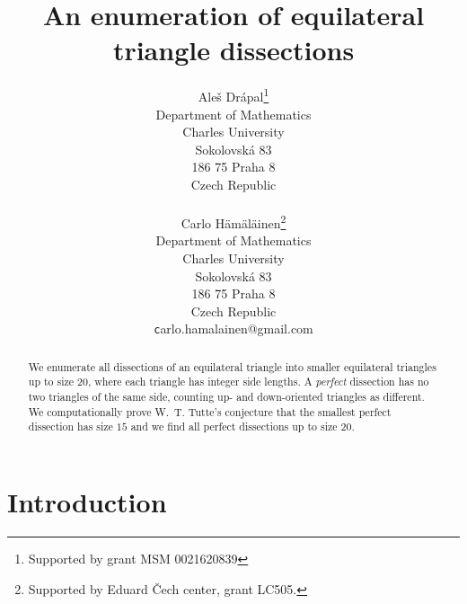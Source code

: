 \documentclass[12pt,amstags,fleqn]{article}
\theoremstyle{plain}
\theoremstyle{definition}
\begin{document}
\title{An enumeration of equilateral triangle dissections}
\author{\Large 
Ale\v s Dr\'apal\footnote{Supported by grant MSM 0021620839}\\
Department of Mathematics \\ Charles University \\ Sokolovsk\'a 83 \\ 186 75 Praha 8 \\ Czech Republic \\
~ \\
Carlo H\"{a}m\"{a}l\"{a}inen\footnote{Supported by Eduard \v Cech center, grant LC505.}  \\
Department of Mathematics \\ Charles University \\ Sokolovsk\'a 83 \\ 186 75 Praha 8 \\ Czech Republic \\
{\texttt carlo.hamalainen@gmail.com}\\
%
}
%   
%   
%   


\maketitle


\begin{abstract}
We enumerate all dissections of an equilateral triangle into smaller
equilateral triangles up to size $20$, where each triangle has integer
side lengths. A {\em perfect} dissection has no two triangles of the
same side, counting up- and down-oriented triangles as different.
We computationally prove W.~T.
Tutte's conjecture that the
smallest perfect dissection has size $15$
and we find all perfect
dissections up to size $20$.
\end{abstract}

\section{Introduction}
\end{document}
